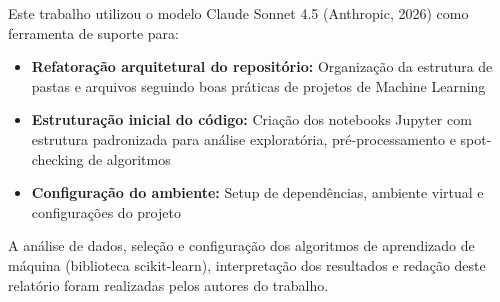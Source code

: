 \documentclass[12pt,a4paper]{article}
\begin{document}
Este trabalho utilizou o modelo Claude Sonnet 4.5 (Anthropic, 2026) como ferramenta de suporte para:

\begin{itemize}
    \item \textbf{Refatoração arquitetural do repositório:} Organização da estrutura de pastas e arquivos seguindo boas práticas de projetos de Machine Learning
    \item \textbf{Estruturação inicial do código:} Criação dos notebooks Jupyter com estrutura padronizada para análise exploratória, pré-processamento e spot-checking de algoritmos
    \item \textbf{Configuração do ambiente:} Setup de dependências, ambiente virtual e configurações do projeto
\end{itemize}

A análise de dados, seleção e configuração dos algoritmos de aprendizado de máquina (biblioteca scikit-learn), interpretação dos resultados e redação deste relatório foram realizadas pelos autores do trabalho.
\end{document}
